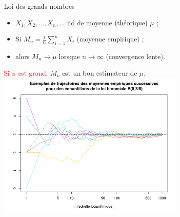 \documentclass{beamer}
\begin{document}
\begin{frame}{Loi des grands nombres}

\begin{itemize}
\item  $X_1, X_2, \ldots, X_n, \ldots$ iid %
de moyenne (théorique) $\mu$ ;
\item Si $M_n=\frac{1}{n}\sum\limits_{i=1}^{n} X_i$ (moyenne empirique) ;
\item alors $M_n \to \mu$ lorsque $n\to\infty$ (convergence lente).
\end{itemize}
\begin{center}
  \textcolor{red}{Si $n$ est grand}, $M_n$ est un bon estimateur de $\mu$. \\
  \includegraphics[width=0.7\textwidth]{images/Rplot_trajectoires_moyenne_empirique.png}
\end{center}
\end{frame}
 
\end{document}
